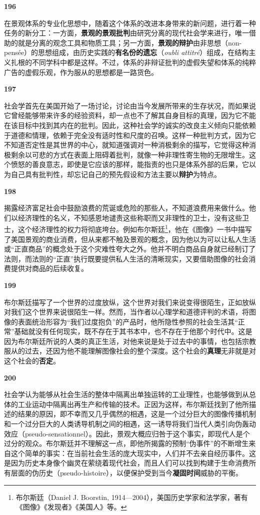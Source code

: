\documentclass[fontset=fandol, a4paper, 12pt, openright]{ctexbook}
\makeatletter
\newcommand{\thesis}[1]{%
    \par\vspace{1.5em}%
    {\centering \textbf{\Large #1}\par}%
    \nobreak\vspace{0.5em}\nobreak
    \@afterindenttrue %
    \@afterheading    %
}
\makeatother
\begin{document}
\thesis{196}
在景观体系的专业化思想中，随着这个体系的改进本身带来的新问题，进行着一种任务的新分工：一方面，\textbf{景观的景观批判}由研究分离的现代社会学来进行，唯一借助的就是分离的观念工具和物质工具；另一方面，\textbf{景观的辩护}由非思想（non-pensée）的思想组成，由历史实践的\textbf{有名份的遗忘}（\textit{oubli attitré}）组成，在结构主义扎根的不同学科中都是这样。不过，体系的非辩证批判的虚假失望和体系的纯粹广告的虚假乐观，作为服从的思想都是一路货色。

\thesis{197}
社会学首先在美国开始了一场讨论，讨论由当今发展所带来的生存状况，而如果说它曾经能够带来许多的经验资料，却一点也不了解其自身目标的真理，因为它不能在该目标中找到其内在的批判。因此，这种社会学的诚实的改良主义倾向只能依赖于道德和情理，依赖于完全没有适时性和尺度的召唤。这样一种批判方式，因为它不知道否定性是其世界的中心，就知道强调对一种消极剩余的描写，它觉得这种消极剩余以可悲的方式在表面上阻碍着批判，就像一种非理性寄生物的无限增生。这个愤怒的善良意志，即使是它应该的那样，能指责的也只是体系外部的后果，它以为自己具有批判性，却忘记自己的预先假设和方法主要以\textbf{辩护}为特点。

\thesis{198}
揭露经济富足社会中鼓励浪费的荒诞或危险的那些人，不知道浪费用来做什么。他们以经济理性的名义，不知感恩地谴责这些称职而又非理性的卫士，没有这些卫士，这个经济理性的权力将彻底垮台。例如布尔斯廷\footnote{布尔斯廷（Daniel J. Boorstin, 1914—2004），美国历史学家和法学家，著有《图像》《发现者》《美国人》等。}，他在《图像》一书中描写了美国景观的商业消费，但从来都不触及景观的概念，因为他以为可以让私人生活或“正直商品”的概念处于这个灾难性夸大之外。他并不明白商品自身就已经制订了法则，而法则的“正直”执行既要提供私人生活的清晰现实，又要借助图像的社会消费提供对商品的后续收复。

\thesis{199}
布尔斯廷描写了一个世界的过度放纵，这个世界对我们来说变得很陌生，正如放纵对我们这个世界来说很陌生一样。然而，当作者以心理学和道德评判的术语，将图像的表面统治形容为“我们过度抱负”的产品时，他所隐性参照的社会生活其“正常”基础就没有任何现实，既不存在于其书本中，也不存在于他那个时代中。这是因为布尔斯廷所说的人类的真正生活，对他来说是处于过去中的事情，也包括宗教服从的过去，还因为他不能理解图像社会的整个深度。这个社会的\textbf{真理}无非就是对这个社会的\textbf{否定}。

\thesis{200}
社会学认为能够从社会生活的整体中隔离出单独运转的工业理性，也能够做到从总体的工业运动中隔离出再生产和传输的技术。正因为这样，布尔斯廷找到了他所描述的结果的原因，即不幸而又几乎偶然的相遇，这是一个过分巨大的图像传播机制和一个过分巨大的人类诱导机制之间的相遇，这一诱导将我们当代人类引向伪轰动效应（pseudo-sensationnel）。因此，景观大概应归咎于这个事实，即现代人是个过分的观众。布尔斯廷并不理解这一点，即他所揭露的预制“伪事件”的不断增生来自这个简单的事实：在当前社会生活的庞大现实中，人们并不去亲自经历事件。这是因为历史本身像个幽灵在萦绕着现代社会，而且人们可以找到构建于生命消费所有层面的伪历史（pseudo-histoire），以便保护受到当今\textbf{凝固时间}威胁的平衡。
\end{document}
